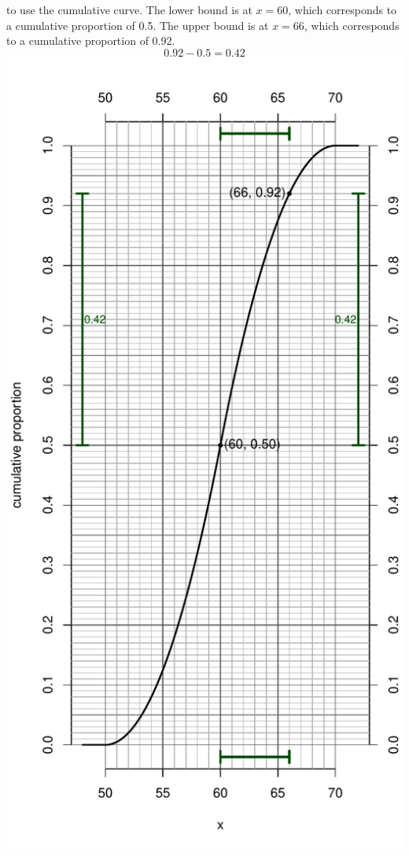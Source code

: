 \begin{solution}
\begin{answerlist}
to use the cumulative curve. The lower bound is at \(x=60\), which
corresponds to a cumulative proportion of 0.5. The upper bound is at
\(x=66\), which corresponds to a cumulative proportion of 0.92.
\[0.92-0.5=0.42\] \includegraphics{unnamed-chunk-22-1.pdf}\\
\end{answerlist}
\end{solution}

